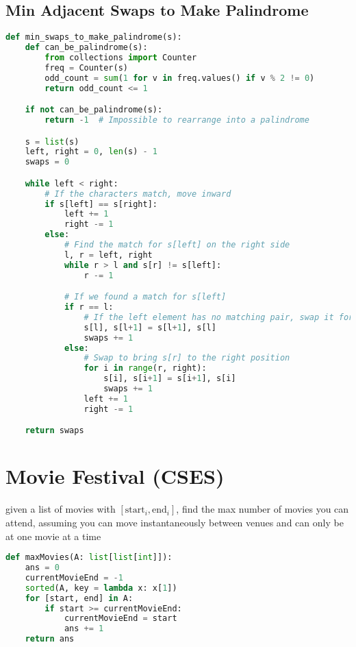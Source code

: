 \documentclass[11pt]{article}
\begin{document}
\subsection{Min Adjacent Swaps to Make Palindrome}

\begin{lstlisting}[language=Python]
def min_swaps_to_make_palindrome(s):
    def can_be_palindrome(s):
        from collections import Counter
        freq = Counter(s)
        odd_count = sum(1 for v in freq.values() if v % 2 != 0)
        return odd_count <= 1

    if not can_be_palindrome(s):
        return -1  # Impossible to rearrange into a palindrome

    s = list(s)
    left, right = 0, len(s) - 1
    swaps = 0

    while left < right:
        # If the characters match, move inward
        if s[left] == s[right]:
            left += 1
            right -= 1
        else:
            # Find the match for s[left] on the right side
            l, r = left, right
            while r > l and s[r] != s[left]:
                r -= 1

            # If we found a match for s[left]
            if r == l:
                # If the left element has no matching pair, swap it forward (for odd-length strings)
                s[l], s[l+1] = s[l+1], s[l]
                swaps += 1
            else:
                # Swap to bring s[r] to the right position
                for i in range(r, right):
                    s[i], s[i+1] = s[i+1], s[i]
                    swaps += 1
                left += 1
                right -= 1

    return swaps
\end{lstlisting}

\section{Movie Festival (CSES)}
given a list of movies with $[\text{start}_{i}, \text{end}_{i}]$, find the max number of movies you can attend, assuming you can move instantaneously between venues and can only be at one movie at a time
\begin{lstlisting}[language=Python]
def maxMovies(A: list[list[int]]):
	ans = 0
	currentMovieEnd = -1
	sorted(A, key = lambda x: x[1])
	for [start, end] in A:
		if start >= currentMovieEnd:
			currentMovieEnd = start
			ans += 1
	return ans
\end{lstlisting}
\end{document}
